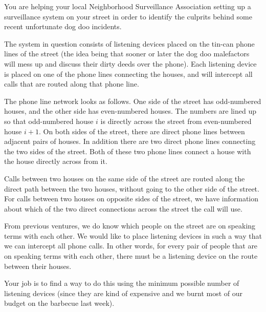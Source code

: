 
%
\noindent
You are helping your local Neighborhood Surveillance Association 
setting up a surveillance system on your street in order to identify
the culprits behind some recent unfortunate dog doo incidents.

The system in question consists of listening devices placed on the
tin-can phone lines of the street (the idea being that sooner or later
the dog doo malefactors will mess up and discuss their dirty deeds
over the phone).  Each listening device is placed on one of the phone
lines connecting the houses, and will intercept all calls that are routed
along that phone line.

The phone line network looks as follows.  One side of the street has
odd-numbered houses, and the other side has even-numbered houses.  The
numbers are lined up so that odd-numbered house $i$ is directly across
the street from even-numbered house $i+1$.  On both sides of the
street, there are direct phone lines between adjacent pairs of houses.
In addition there are two direct phone lines connecting the two sides
of the street.  Both of these two phone lines connect a house with
the house directly across from it.

Calls between two houses on the same side of the street are routed
along the direct path between the two houses, without going to the
other side of the street.  For calls between two houses on opposite
sides of the street, we have information about which of the two direct
connections across the street the call will use.

From previous ventures, we do know which people on the street are on
speaking terms with each other.  We would like to place listening
devices in such a way that we can intercept all phone calls.  In other
words, for every pair of people that are on speaking terms with each
other, there must be a listening device on the route between their houses.

Your job is to find a way to do this using the minimum possible number
of listening devices (since they are kind of expensive and we burnt
most of our budget on the barbecue last week).

